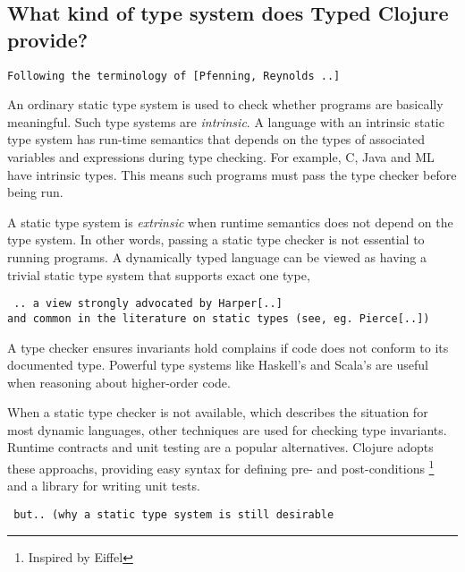 \subsection{What kind of type system does Typed Clojure provide?}



\begin{verbatim}Following the terminology of [Pfenning, Reynolds ..]\end{verbatim}
An ordinary static type system is used to check whether programs are basically
meaningful. Such type systems are \emph{intrinsic}. A language with an intrinsic
static type system has run-time semantics that depends on the types of associated
variables and expressions during type checking.
For example, C, Java and ML have intrinsic types.
This means such programs must pass the type checker before being run.

A static type system is \emph{extrinsic} when runtime semantics
does not depend on the type system. In other words, passing a static type checker
is not essential to running programs. A dynamically typed language can be viewed
as having a trivial static type system that supports exact one type,
\begin{verbatim} .. a view strongly advocated by Harper[..]
and common in the literature on static types (see, eg. Pierce[..])
\end{verbatim}


A type checker ensures invariants hold complains if code
does not conform to its documented type. Powerful type systems like
Haskell's and Scala's are useful when reasoning about higher-order code.

When a static type checker is not available, which describes the situation
for most dynamic languages, other techniques are used for checking
type invariants. Runtime contracts and unit testing are a popular alternatives.
Clojure adopts these approachs, providing easy syntax for defining pre-
and post-conditions \footnote{Inspired by Eiffel} and a library for writing unit tests.
\begin{verbatim} but.. (why a static type system is still desirable\end{verbatim}

